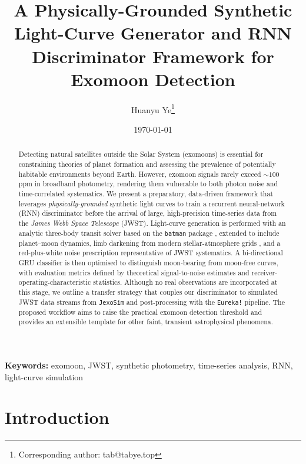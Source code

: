 \documentclass[11pt]{article}
\title{\textbf{A Physically-Grounded Synthetic Light-Curve Generator and RNN Discriminator Framework for Exomoon Detection}}
\author[1]{Huanyu Ye\thanks{Corresponding author: tab@tabye.top}}
\date{\today}
\begin{document}
\maketitle

\begin{abstract}
	Detecting natural satellites outside the Solar System (exomoons) is essential for constraining theories of planet formation and assessing the prevalence of potentially habitable environments beyond Earth.  However, exomoon signals rarely exceed \(\sim100\)\,ppm in broadband photometry, rendering them vulnerable to both photon noise and time-correlated systematics.  We present a preparatory, data-driven framework that leverages \emph{physically-grounded} synthetic light curves to train a recurrent neural-network (RNN) discriminator before the arrival of large, high-precision time-series data from the \textit{James Webb Space Telescope} (JWST).  Light-curve generation is performed with an analytic three-body transit solver based on the \texttt{batman} package \citep{Kreidberg2015}, extended to include planet–moon dynamics, limb darkening from modern stellar‐atmosphere grids \citep{Claret2023}, and a red-plus-white noise prescription representative of JWST systematics.  A bi-directional GRU classifier is then optimised to distinguish moon-bearing from moon-free curves, with evaluation metrics defined by theoretical signal-to-noise estimates and receiver-operating-characteristic statistics.  Although no real observations are incorporated at this stage, we outline a transfer strategy that couples our discriminator to simulated JWST data streams from \texttt{JexoSim} and post-processing with the \texttt{Eureka!} pipeline.  The proposed workflow aims to raise the practical exomoon detection threshold and provides an extensible template for other faint, transient astrophysical phenomena.
\end{abstract}

\textbf{Keywords:} exomoon, JWST, synthetic photometry, time-series analysis, RNN, light-curve simulation

\newpage

\tableofcontents

\section{Introduction}\label{sec:intro}
\end{document}
